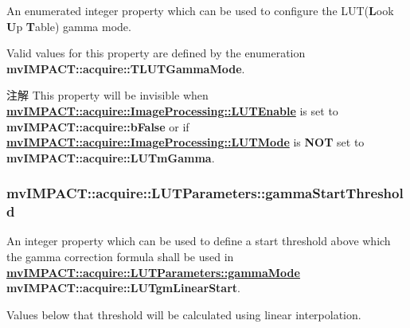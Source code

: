 An enumerated integer property which can be used to configure the L\+U\+T({\bfseries L}ook {\bfseries U}p {\bfseries T}able) gamma mode. 

Valid values for this property are defined by the enumeration {\bfseries mv\+I\+M\+P\+A\+C\+T\+::acquire\+::\+T\+L\+U\+T\+Gamma\+Mode}.

\begin{DoxyNote}{注解}
This property will be invisible when {\bfseries \hyperlink{classmv_i_m_p_a_c_t_1_1acquire_1_1_image_processing_a7f8eb83578d97fde3405e6ae5d09e5c3}{mv\+I\+M\+P\+A\+C\+T\+::acquire\+::\+Image\+Processing\+::\+L\+U\+T\+Enable}} is set to {\bfseries mv\+I\+M\+P\+A\+C\+T\+::acquire\+::b\+False} or if {\bfseries \hyperlink{classmv_i_m_p_a_c_t_1_1acquire_1_1_image_processing_ae2f3059a3574e6a08a2d4348f1d5a152}{mv\+I\+M\+P\+A\+C\+T\+::acquire\+::\+Image\+Processing\+::\+L\+U\+T\+Mode}} is {\bfseries N\+O\+T} set to {\bfseries mv\+I\+M\+P\+A\+C\+T\+::acquire\+::\+L\+U\+Tm\+Gamma}. 
\end{DoxyNote}
\hypertarget{classmv_i_m_p_a_c_t_1_1acquire_1_1_l_u_t_parameters_ac8e85006531eb155a7ccd01590af5e27}{
\subsubsection[{gamma\+Start\+Threshold}]{ mv\+I\+M\+P\+A\+C\+T\+::acquire\+::\+L\+U\+T\+Parameters\+::gamma\+Start\+Threshold}}\label{classmv_i_m_p_a_c_t_1_1acquire_1_1_l_u_t_parameters_ac8e85006531eb155a7ccd01590af5e27}


An integer property which can be used to define a start threshold above which the gamma correction formula shall be used in {\bfseries \hyperlink{classmv_i_m_p_a_c_t_1_1acquire_1_1_l_u_t_parameters_aa9859adce405ea020bad38f40d779034}{mv\+I\+M\+P\+A\+C\+T\+::acquire\+::\+L\+U\+T\+Parameters\+::gamma\+Mode}} {\bfseries mv\+I\+M\+P\+A\+C\+T\+::acquire\+::\+L\+U\+Tgm\+Linear\+Start}. 

Values below that threshold will be calculated using linear interpolation.

